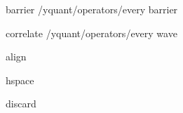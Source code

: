 \yquant@langhelper@declare@command@uncontrolled%
   {barrier}%
   \yquant@register@get@allowmultitrue%
   {%
      \yquant@prepare%
         {}%
         {/yquant/operators/every barrier}%
   }%

\yquant@langhelper@declare@command@uncontrolled%
   {correlate}%
   {%
      \yquant@register@get@allowmultitrue%
      \let\yquant@register@multi@splitparts=\yquant@register@multi@splitparts@sepall%
   }{%
      \yquant@prepare%
         {}%
         {/yquant/operators/every wave}%
   }

\yquant@langhelper@declare@command@uncontrolled%
   {align}%
   {}%
   {%
      \yquant@circuit@align\yquant@circuit@operator@targets%
   }

\yquant@langhelper@declare@command@uncontrolled%
   {hspace}%
   {%
      \yquant@langhelper@validate\amount\dimen\yquant@lang@attr@value%
   }{%
      \yquant@circuit@hspace\yquant@circuit@operator@targets\amount%
   }

\yquant@langhelper@declare@command@uncontrolled%
   {discard}%
   {\yquant@langhelper@execclear@lastgatefalse}%
   {%
      \let\yquant@circuit@settype@to=\yquant@register@type@none%
      \yquant@circuit@actonwires%
         \yquant@circuit@settype@prepare%
         \yquant@circuit@settype%
         \yquant@circuit@operator@targets%
         {}%
   }

